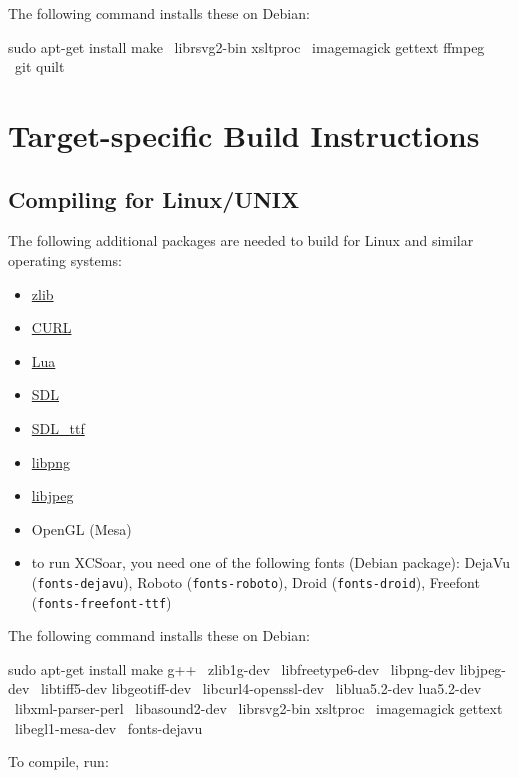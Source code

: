 The following command installs these on Debian:

\begin{verbatim*}
sudo apt-get install make \
  librsvg2-bin xsltproc \
  imagemagick gettext ffmpeg \
  git quilt
\end{verbatim*}

\section{Target-specific Build Instructions}

\subsection{Compiling for Linux/UNIX}

The following additional packages are needed to build for Linux and
similar operating systems:

\begin{itemize}
\item \href{http://www.zlib.net/}{zlib}
\item \href{http://curl.haxx.se/}{CURL}
\item \href{http://www.lua.org/}{Lua}
\item \href{http://www.libsdl.org/}{SDL}
\item \href{http://www.libsdl.org/projects/SDL\_ttf/}{SDL\_ttf}
\item \href{http://www.libpng.org/}{libpng}
\item \href{http://libjpeg.sourceforge.net/}{libjpeg}
\item OpenGL (Mesa)
\item to run XCSoar, you need one of the following fonts (Debian
  package): DejaVu (\texttt{fonts-dejavu}),
  Roboto (\texttt{fonts-roboto}),
  Droid (\texttt{fonts-droid}),
  Freefont (\texttt{fonts-freefont-ttf})
\end{itemize}

The following command installs these on Debian:

\begin{verbatim*}
sudo apt-get install make g++ \
  zlib1g-dev \
  libfreetype6-dev \
  libpng-dev libjpeg-dev \
  libtiff5-dev libgeotiff-dev \
  libcurl4-openssl-dev \
  liblua5.2-dev lua5.2-dev \
  libxml-parser-perl \
  libasound2-dev \
  librsvg2-bin xsltproc \
  imagemagick gettext \
  libegl1-mesa-dev \
  fonts-dejavu
\end{verbatim*}

To compile, run:

